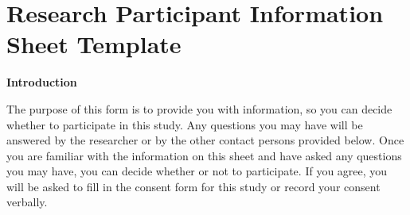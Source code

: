 \section{Research Participant Information Sheet Template}
\label{app:info-sheet}

\textbf{Introduction}

The purpose of this form is to provide you with information, so you can decide whether to participate in this study. Any questions you may have will be answered by the researcher or by the other contact persons provided below. Once you are familiar with the information on this sheet and have asked any questions you may have, you can decide whether or not to participate. If you agree, you will be asked to fill in the consent form for this study or record your consent verbally.

